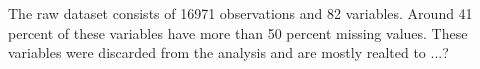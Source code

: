 The raw dataset consists of 16971 observations and 82 variables. Around 41 percent
of these variables have more than 50 percent missing values. These variables
were discarded from the analysis and are mostly realted to ...?
